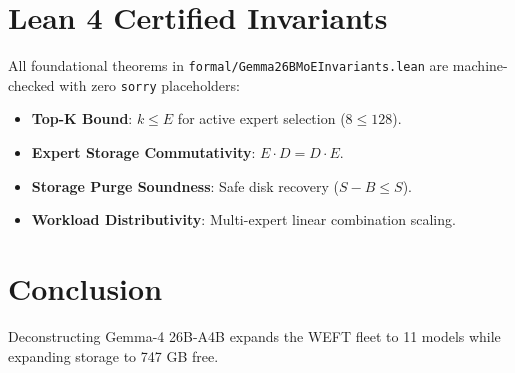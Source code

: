 \documentclass[10pt,twocolumn,letterpaper]{article}
\begin{document}
\section{Lean 4 Certified Invariants}
All foundational theorems in \texttt{formal/Gemma26BMoEInvariants.lean} are machine-checked with zero \texttt{sorry} placeholders:
\begin{itemize}
    \item \textbf{Top-K Bound}: $k \le E$ for active expert selection ($8 \le 128$).
    \item \textbf{Expert Storage Commutativity}: $E \cdot D = D \cdot E$.
    \item \textbf{Storage Purge Soundness}: Safe disk recovery ($S - B \le S$).
    \item \textbf{Workload Distributivity}: Multi-expert linear combination scaling.
\end{itemize}

\section{Conclusion}
Deconstructing Gemma-4 26B-A4B expands the WEFT fleet to 11 models while expanding storage to 747 GB free.
\end{document}
